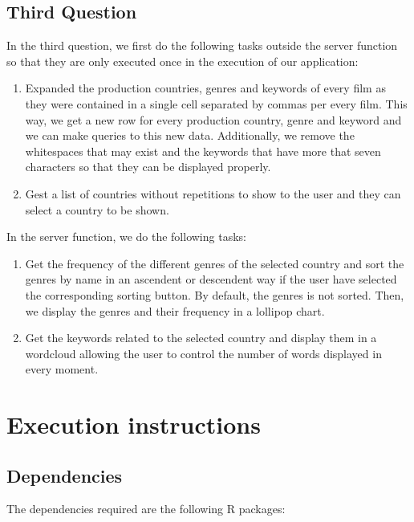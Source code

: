 \subsection{Third Question}
In the third question, we first do the following tasks outside the server function so that they are only executed once in the execution of our application:

\begin{enumerate}
	\item Expanded the production countries, genres and keywords of every film as they were contained in a single cell separated by commas per every film. This way, we get a new row for every production country, genre and keyword and we can make queries to this new data. Additionally, we remove the whitespaces that may exist and the keywords that have more that seven characters so that they can be displayed properly.
	\item Gest a list of countries without repetitions to show to the user and they can select a country to be shown.
\end{enumerate}

In the server function, we do the following tasks:

\begin{enumerate}
	\item Get the frequency of the different genres of the selected country and sort the genres by name in an ascendent or descendent way if the user have selected the corresponding sorting button. By default, the genres is not sorted. Then, we display the genres and their frequency in a lollipop chart.
	\item Get the keywords related to the selected country and display them in a wordcloud allowing the user to control the number of words displayed in every moment.
\end{enumerate}
\section{Execution instructions}

\subsection{Dependencies}

The dependencies required are the following R packages:

